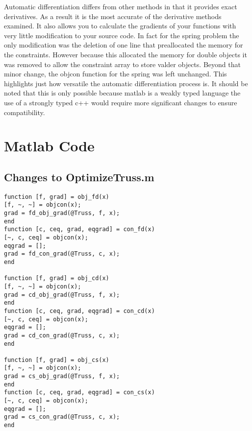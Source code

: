 \documentclass{article}
\begin{document}
Automatic differentiation differs from other methods in that it provides exact derivatives. As a result it is the most accurate of the derivative methods examined.  It also allows you to calculate the gradients of your functions with very little modification to your source code.  In fact for the spring problem the only modification was the deletion of one line that preallocated the memory for the constraints. However because this allocated the memory for double objects it was removed to allow the constraint array to store valder objects.  Beyond that minor change, the objcon function for the spring was left unchanged.  This highlights just how versatile the automatic differentiation process is.  It should be noted that this is only possible because matlab is a weakly typed language the use of a strongly typed c++ would require more significant changes to ensure compatibility.


%

\section{Matlab Code}\label{sec:code}
\subsection{Changes to OptimizeTruss.m}\label{sec:optTrussChanges}
\begin{verbatim}
function [f, grad] = obj_fd(x)
[f, ~, ~] = objcon(x);
grad = fd_obj_grad(@Truss, f, x);
end
function [c, ceq, grad, eqgrad] = con_fd(x)
[~, c, ceq] = objcon(x);
eqgrad = [];
grad = fd_con_grad(@Truss, c, x);
end

function [f, grad] = obj_cd(x)
[f, ~, ~] = objcon(x);
grad = cd_obj_grad(@Truss, f, x);
end
function [c, ceq, grad, eqgrad] = con_cd(x)
[~, c, ceq] = objcon(x);
eqgrad = [];
grad = cd_con_grad(@Truss, c, x);
end

function [f, grad] = obj_cs(x)
[f, ~, ~] = objcon(x);
grad = cs_obj_grad(@Truss, f, x);
end
function [c, ceq, grad, eqgrad] = con_cs(x)
[~, c, ceq] = objcon(x);
eqgrad = [];
grad = cs_con_grad(@Truss, c, x);
end
\end{verbatim}
\end{document}
